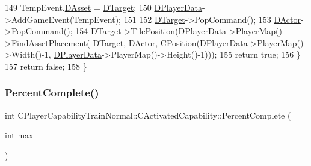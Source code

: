 \begin{DoxyCode}
149         TempEvent.\hyperlink{structSGameEvent_a40c85eeac83b96887b7449c9bdc5d624}{DAsset} = \hyperlink{classCActivatedPlayerCapability_a8a1cf50b6501bcfd55af0c935828e395}{DTarget};
150         \hyperlink{classCActivatedPlayerCapability_a9bf27c322a73f4b11c8183cc1973c3d8}{DPlayerData}->AddGameEvent(TempEvent);
151         
152         \hyperlink{classCActivatedPlayerCapability_a8a1cf50b6501bcfd55af0c935828e395}{DTarget}->PopCommand();
153         \hyperlink{classCActivatedPlayerCapability_a54ca944b47bff2718330639941d402b0}{DActor}->PopCommand();
154         \hyperlink{classCActivatedPlayerCapability_a8a1cf50b6501bcfd55af0c935828e395}{DTarget}->TilePosition(\hyperlink{classCActivatedPlayerCapability_a9bf27c322a73f4b11c8183cc1973c3d8}{DPlayerData}->PlayerMap()->FindAssetPlacement(
      \hyperlink{classCActivatedPlayerCapability_a8a1cf50b6501bcfd55af0c935828e395}{DTarget}, \hyperlink{classCActivatedPlayerCapability_a54ca944b47bff2718330639941d402b0}{DActor}, \hyperlink{classCPosition}{CPosition}(\hyperlink{classCActivatedPlayerCapability_a9bf27c322a73f4b11c8183cc1973c3d8}{DPlayerData}->PlayerMap()->Width()-1, 
      \hyperlink{classCActivatedPlayerCapability_a9bf27c322a73f4b11c8183cc1973c3d8}{DPlayerData}->PlayerMap()->Height()-1)));
155         \textcolor{keywordflow}{return} \textcolor{keyword}{true};    
156     \}
157     \textcolor{keywordflow}{return} \textcolor{keyword}{false};
158 \}
\end{DoxyCode}
\hypertarget{classCPlayerCapabilityTrainNormal_1_1CActivatedCapability_ac0d2dd8e1b3aedb0873149ba4c92e6f7}{}\label{classCPlayerCapabilityTrainNormal_1_1CActivatedCapability_ac0d2dd8e1b3aedb0873149ba4c92e6f7} 
\subsubsection{\texorpdfstring{Percent\+Complete()}{PercentComplete()}}
{\footnotesize\ttfamily int C\+Player\+Capability\+Train\+Normal\+::\+C\+Activated\+Capability\+::\+Percent\+Complete (\begin{DoxyParamCaption}\item[{int}]{max }\end{DoxyParamCaption})\hspace{0.3cm}{\ttfamily [virtual]}}



